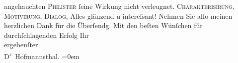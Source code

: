 \begin{ledgroupsized}[t]{13cm}
                    angehauchten \textsc{Philister} ſeine {\pb}Wirkung nicht verleugnet. \textsc{Charakterisirung}, \textsc{Motivirung}, \textsc{Dialog}, Alles glänzend u intereſsant!\pend
           \pstart
           Nehmen Sie alſo meinen herzlichen Dank für die Überſendg.\pend
           \pstart
           Mit den beſten Wünſchen für durchſchlagenden Erfolg
                            Ihr{\\[\baselineskip]}ergebenſter{\\[\baselineskip]}\spacefill\mbox{D\textsuperscript{r}
                        Hofmannsthal.}\pend
           \leftskip=0em{}
         
         \endnumbering{}\end{ledgroupsized}  \newcommand{\dateiname}{L00050}\newcommand{\titel}{Hugo August von Hofmannsthal an Arthur Schnitzler, 7. 12. 1891}\newcommand{\editorInnen}{Martin Anton Müller und Gerd-Hermann Susen}
      